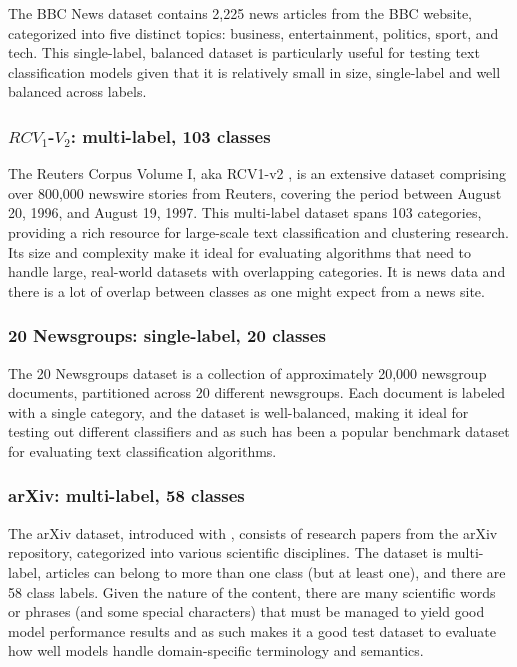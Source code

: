 \documentclass[final]{clv2025}
\begin{document}
The BBC News dataset \cite{greene} contains 2,225 news articles from the BBC website, categorized into five distinct topics: business, entertainment, politics, sport, and tech. This single-label, balanced dataset is particularly useful for testing text classification models given that it is relatively small in size, single-label and well balanced across labels. 


\subsubsection{$RCV_{1}$-$V_{2}$: multi-label, 103 classes}

The Reuters Corpus Volume I, aka RCV1-v2 \cite{lewis2004}, is an extensive dataset comprising over 800,000 newswire stories from Reuters, covering the period between August 20, 1996, and August 19, 1997. This multi-label dataset spans 103 categories, providing a rich resource for large-scale text classification and clustering research. Its size and complexity make it ideal for evaluating algorithms that need to handle large, real-world datasets with overlapping categories. It is news data and there is a lot of overlap between classes as one might expect from a news site.

\subsubsection{20 Newsgroups: single-label, 20 classes}

The 20 Newsgroups dataset \cite{LANG1995331} is a collection of approximately 20,000 newsgroup documents, partitioned across 20 different newsgroups. Each document is labeled with a single category, and the dataset is well-balanced, making it ideal for testing out different classifiers and as such has been a popular benchmark dataset for evaluating text classification algorithms. 


\subsubsection{arXiv: multi-label, 58 classes}

The arXiv dataset, introduced with \cite{sinha}, consists of research papers from the arXiv repository, categorized into various scientific disciplines. The dataset is multi-label, articles can belong to more than one class (but at least one), and there are 58 class labels. Given the nature of the content, there are many scientific words or phrases (and some special characters) that must be managed to yield good model performance results and as such makes it a good test dataset to evaluate how well models handle domain-specific terminology and semantics.
\end{document}
